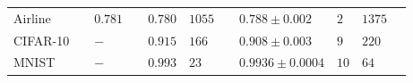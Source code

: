 \documentclass[a0,portrait]{a0poster}
\begin{document}
\begin{multicols}{2}
\begin{center}
\begin{tabular}{ll ll llll lll}

      Airline && 
      $0.781$ && $0.780$ & $1055$ &&
      $0.788 \pm 0.002$ & $2$ & $1375$\\

      CIFAR-10 && 
      $-$ && $0.915$ & $166$ &&
      $0.908 \pm 0.003$ & $9$ & $220$\\

      MNIST && 
      $-$ && $0.993$ & $23$ &&
      $0.9936 \pm 0.0004$ & $10$ & $64$\\
      \bottomrule
    \end{tabular}
\end{center}


\nocite{*} %



\end{multicols}
\end{document}
